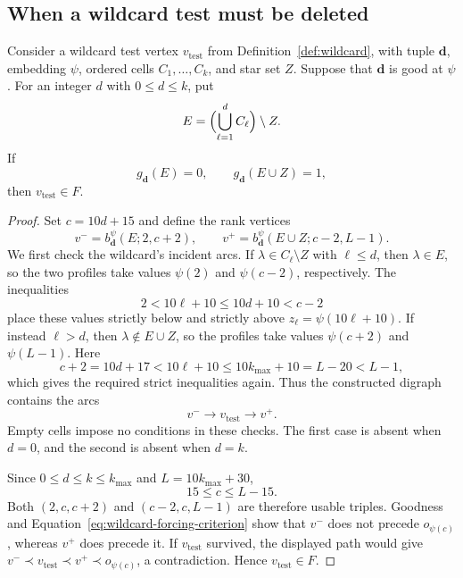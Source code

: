 \subsection{When a wildcard test must be deleted}

\begin{lemma}
\label{lem:wildcard-forcing}
Consider a wildcard test vertex $v_{\mathrm{test}}$ from
Definition~\ref{def:wildcard}, with tuple $\mathbf d$, embedding $\psi$,
ordered cells $C_1,\ldots,C_k$, and star set $Z$.  Suppose that
$\mathbf d$ is good at $\psi$.  For an integer $d$ with $0\le d\le k$,
put
\[
  E=\Bigl(\bigcup_{\ell=1}^{d}C_\ell\Bigr)\setminus Z.
\]
If
\begin{equation}
\label{eq:wildcard-forcing-criterion}
  g_{\mathbf d}(E)=0,
  \qquad g_{\mathbf d}(E\cup Z)=1,
\end{equation}
then $v_{\mathrm{test}}\in F$.
\end{lemma}

\begin{proof}
Set $c=10d+15$ and define the rank vertices
\[
  v^-=b_{\mathbf d}^{\psi}(E;2,c+2),
  \qquad
  v^+=b_{\mathbf d}^{\psi}(E\cup Z;c-2,L-1).
\]
We first check the wildcard's incident arcs.  If
$\lambda\in C_\ell\setminus Z$ with $\ell\le d$, then
$\lambda\in E$, so the two profiles take values $\psi(2)$ and
$\psi(c-2)$, respectively.  The inequalities
\[
  2<10\ell+10\le10d+10<c-2
\]
place these values strictly below and strictly above
$z_\ell=\psi(10\ell+10)$.  If instead $\ell>d$, then
$\lambda\notin E\cup Z$, so the profiles take values $\psi(c+2)$ and
$\psi(L-1)$.  Here
\[
  c+2=10d+17<10\ell+10
  \le10k_{\max}+10=L-20<L-1,
\]
which gives the required strict inequalities again.  Thus the constructed
digraph contains the arcs
\[
  v^-\longrightarrow v_{\mathrm{test}}\longrightarrow v^+.
\]
Empty cells impose no conditions in these checks.  The first case is
absent when $d=0$, and the second is absent when $d=k$.

Since $0\le d\le k\le k_{\max}$ and $L=10k_{\max}+30$,
\[
  15\le c\le L-15.
\]
Both $(2,c,c+2)$ and $(c-2,c,L-1)$ are therefore usable triples.
Goodness and Equation~\eqref{eq:wildcard-forcing-criterion} show that
$v^-$ does not precede $o_{\psi(c)}$, whereas $v^+$ does precede it.
If $v_{\mathrm{test}}$ survived, the displayed path would give
$v^-\prec v_{\mathrm{test}}\prec v^+\prec o_{\psi(c)}$, a contradiction.
Hence $v_{\mathrm{test}}\in F$.
\end{proof}
